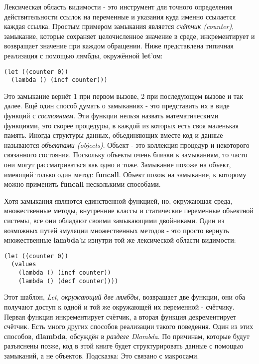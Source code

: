 Лексическая область видимости - это инструмент для точного определения действительности ссылок на переменные и указания куда именно ссылается каждая ссылка. Простым примером замыкания является \emph{счётчик (counter)}, замыкание, которые сохраняет целочисленное значение в среде, инкрементирует и возвращает значение при каждом обращении. Ниже представлена типичная реализация с помощью лямбды, окружённой \textbf{let}'ом:

\begin{verbatim}
(let ((counter 0))
  (lambda () (incf counter)))
\end{verbatim}

Это замыкание вернёт 1 при первом вызове, 2 при последующем вызове и так далее. Ещё один способ думать о замыканиях - это представить их в виде функций с \emph{состоянием}. Эти функции нельзя назвать математическими функциями, это скорее процедуры, в каждой из которых есть своя маленькая память. Иногда структуры данных, объединяющих вместе код и данные называются \emph{объектами (objects)}. Объект - это коллекция процедур и некоторого связанного состояния. Поскольку объекты очень близки к замыканиям, то часто они могут рассматриваться как одно и тоже. Замыкание похоже на объект, имеющий только один метод: \textbf{funcall}. Объект похож на замыкание, к которому можно применить \textbf{funcall} несколькими способами.

Хотя замыкания являются единственной функцией, но, окружающая среда, множественные методы, внутренние классы и статические переменные объектной системы, все они обладают своими замыкающими двойниками. Один из возможных путей эмуляции множественных методов - это просто вернуть множественные \textbf{lambda}'ы изнутри той же лексической области видимости:

\begin{verbatim}
(let ((counter 0))
  (values
    (lambda () (incf counter))
    (lambda () (decf counter))))
\end{verbatim}

Этот шаблон, \emph{Let, окружающий две лямбды}, возвращает две функции, они оба получают доступ к одной и той же окружающей их переменной - счётчику. Первая функция инкрементирует счётчик, а вторая функция декрементирует счётчик. Есть много других способов реализации такого поведения. Один из этих способов, \textbf{dlambda}, обсуждён в \emph{разделе  Dlambda}. По причинам, которые будут разъяснены позже, код в этой книге будет структурировать данные с помощью замыканий, а не объектов. Подсказка: Это связано с макросами.

